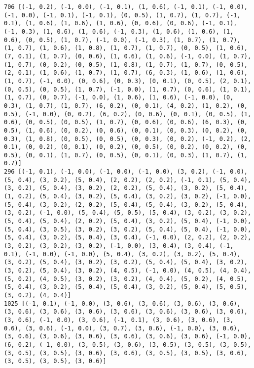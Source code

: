 \documentclass[11pt]{article}
\begin{document}
\begin{Verbatim}[commandchars=\\\{\}]
706 [(-1, 0.2), (-1, 0.0), (-1, 0.1), (1, 0.6), (-1, 0.1), (-1, 0.0), (-1, 0.0), (-1, 0.1), (-1, 0.1), (0, 0.5), (1, 0.7), (1, 0.7), (-1, 0.1), (1, 0.6), (1, 0.6), (1, 0.6), (0, 0.6), (0, 0.6), (-1, 0.1), (-1, 0.3), (1, 0.6), (1, 0.6), (-1, 0.3), (1, 0.6), (1, 0.6), (1, 0.6), (0, 0.5), (1, 0.7), (-1, 0.0), (-1, 0.3), (1, 0.7), (1, 0.7), (1, 0.7), (1, 0.6), (1, 0.8), (1, 0.7), (1, 0.7), (0, 0.5), (1, 0.6), (7, 0.1), (1, 0.7), (0, 0.6), (1, 0.6), (1, 0.6), (-1, 0.0), (1, 0.7), (1, 0.7), (0, 0.2), (0, 0.5), (1, 0.8), (1, 0.7), (1, 0.7), (0, 0.5), (2, 0.1), (1, 0.6), (1, 0.7), (1, 0.7), (6, 0.3), (1, 0.6), (1, 0.6), (1, 0.7), (-1, 0.0), (0, 0.6), (0, 0.3), (0, 0.1), (0, 0.5), (2, 0.1), (0, 0.5), (0, 0.5), (1, 0.7), (-1, 0.0), (1, 0.7), (0, 0.6), (1, 0.1), (1, 0.7), (0, 0.7), (-1, 0.0), (1, 0.6), (1, 0.6), (-1, 0.0), (0, 0.3), (1, 0.7), (1, 0.7), (6, 0.2), (0, 0.1), (4, 0.2), (1, 0.2), (0, 0.5), (-1, 0.0), (0, 0.2), (6, 0.2), (0, 0.6), (0, 0.1), (0, 0.5), (1, 0.6), (0, 0.5), (0, 0.5), (1, 0.7), (0, 0.6), (0, 0.6), (6, 0.3), (0, 0.5), (1, 0.6), (0, 0.2), (0, 0.6), (0, 0.1), (0, 0.3), (0, 0.2), (0, 0.3), (1, 0.8), (0, 0.5), (0, 0.5), (0, 0.3), (0, 0.2), (-1, 0.2), (2, 0.1), (0, 0.2), (0, 0.1), (0, 0.2), (0, 0.5), (0, 0.2), (0, 0.2), (0, 0.5), (0, 0.1), (1, 0.7), (0, 0.5), (0, 0.1), (0, 0.3), (1, 0.7), (1, 0.7)]
296 [(-1, 0.1), (-1, 0.0), (-1, 0.0), (-1, 0.0), (3, 0.2), (-1, 0.0), (5, 0.4), (3, 0.2), (5, 0.4), (2, 0.2), (2, 0.2), (-1, 0.1), (5, 0.4), (3, 0.2), (5, 0.4), (3, 0.2), (2, 0.2), (5, 0.4), (3, 0.2), (5, 0.4), (1, 0.2), (5, 0.4), (3, 0.2), (5, 0.4), (3, 0.2), (3, 0.2), (-1, 0.0), (5, 0.4), (3, 0.2), (2, 0.2), (5, 0.4), (5, 0.4), (3, 0.2), (5, 0.4), (3, 0.2), (-1, 0.0), (5, 0.4), (5, 0.5), (5, 0.4), (3, 0.2), (3, 0.2), (5, 0.4), (5, 0.4), (2, 0.2), (5, 0.4), (3, 0.2), (5, 0.4), (-1, 0.0), (5, 0.4), (3, 0.5), (3, 0.2), (3, 0.2), (5, 0.4), (5, 0.4), (-1, 0.0), (5, 0.4), (3, 0.2), (5, 0.4), (3, 0.4), (-1, 0.0), (2, 0.2), (2, 0.2), (3, 0.2), (3, 0.2), (3, 0.2), (-1, 0.0), (3, 0.4), (3, 0.4), (-1, 0.1), (-1, 0.0), (-1, 0.0), (5, 0.4), (3, 0.2), (3, 0.2), (5, 0.4), (3, 0.2), (5, 0.4), (3, 0.2), (3, 0.2), (5, 0.4), (5, 0.4), (3, 0.2), (3, 0.2), (5, 0.4), (3, 0.2), (4, 0.5), (-1, 0.0), (4, 0.5), (4, 0.4), (5, 0.2), (4, 0.5), (3, 0.2), (3, 0.2), (4, 0.4), (5, 0.2), (4, 0.5), (5, 0.4), (3, 0.2), (5, 0.4), (5, 0.4), (3, 0.2), (5, 0.4), (5, 0.5), (3, 0.2), (4, 0.4)]
1025 [(-1, 0.1), (-1, 0.0), (3, 0.6), (3, 0.6), (3, 0.6), (3, 0.6), (3, 0.6), (3, 0.6), (3, 0.6), (3, 0.6), (3, 0.6), (3, 0.6), (3, 0.6), (3, 0.6), (-1, 0.0), (3, 0.6), (-1, 0.1), (3, 0.6), (3, 0.6), (3, 0.6), (3, 0.6), (-1, 0.0), (3, 0.7), (3, 0.6), (-1, 0.0), (3, 0.6), (3, 0.6), (3, 0.6), (3, 0.6), (3, 0.6), (3, 0.6), (3, 0.6), (-1, 0.0), (6, 0.2), (-1, 0.0), (3, 0.5), (3, 0.6), (3, 0.5), (3, 0.5), (3, 0.5), (3, 0.5), (3, 0.5), (3, 0.6), (3, 0.6), (3, 0.5), (3, 0.5), (3, 0.6), (3, 0.5), (3, 0.5), (3, 0.6)]

\end{Verbatim}
\end{document}
